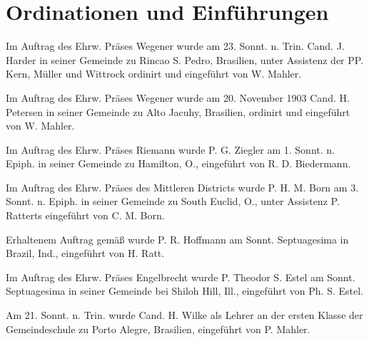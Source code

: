 \chapter{Ordinationen und Einführungen}

Im Auftrag des Ehrw. Präses Wegener wurde am 23. Sonnt. n. Trin. Cand. J. Harder in seiner Gemeinde zu Rincao S. Pedro, Brasilien, unter Assistenz der PP. Kern, Müller und Wittrock ordinirt und eingeführt von W. Mahler.

Im Auftrag des Ehrw. Präses Wegener wurde am 20. November 1903 Cand. H. Petersen in seiner Gemeinde zu Alto Jacuhy, Brasilien, ordinirt und eingeführt von W. Mahler.

Im Auftrag des Ehrw. Präses Riemann wurde P. G. Ziegler am 1. Sonnt. n. Epiph. in seiner Gemeinde zu Hamilton, O., eingeführt von R. D. Biedermann.

Im Auftrag des Ehrw. Präses des Mittleren Districts wurde P. H. M. Born am 3. Sonnt. n. Epiph. in seiner Gemeinde zu South Euclid, O., unter Assistenz P. Ratterts eingeführt von C. M. Born.


Erhaltenem Auftrag gemäß wurde P. R. Hoffmann am Sonnt. Septuagesima in Brazil, Ind., eingeführt von H. Ratt.

Im Auftrag des Ehrw. Präses Engelbrecht wurde P. Theodor S. Estel am Sonnt. Septuagesima in seiner Gemeinde bei Shiloh Hill, Ill., eingeführt von Ph. S. Estel.

Am 21. Sonnt. n. Trin. wurde Cand. H. Wilke als Lehrer an der ersten Klasse der Gemeindeschule zu Porto Alegre, Brasilien, eingeführt von P. Mahler.
